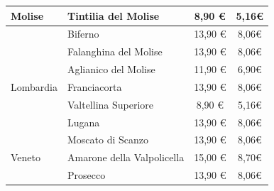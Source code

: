 \documentclass[12pt, a4paper]{article}
\begin{document}
\begin{longtable}{@{}|l|l|c|c|}
Molise               & Tintilia del Molise                                                       & 8,90 €                                                          & 5,16€                                                                                 \\ \hline
& Biferno                                                                   & 13,90 €                                                         & 8,06€                                                                                 \\ \hline
& Falanghina del Molise                                                     & 13,90 €                                                         & 8,06€                                                                                 \\ \hline
& Aglianico del Molise                                                      & 11,90 €                                                         & 6,90€                                                                                 \\ \hline
Lombardia            & Franciacorta                                                              & 13,90 €                                                         & 8,06€                                                                                 \\ \hline
& Valtellina Superiore                                                      & 8,90 €                                                          & 5,16€                                                                                 \\ \hline
& Lugana                                                                    & 13,90 €                                                         & 8,06€                                                                                 \\ \hline
& Moscato di Scanzo                                                         & 13,90 €                                                         & 8,06€                                                                                 \\ \hline
Veneto               & Amarone della Valpolicella                                                & 15,00 €                                                         & 8,70€                                                                                 \\ \hline
& Prosecco                                                                  & 13,90 €                                                         & 8,06€                                                                                 \\ \hline

\end{longtable}
\end{document}
